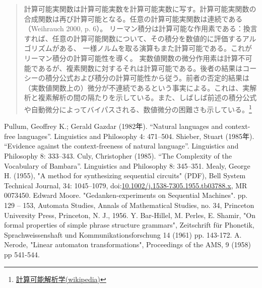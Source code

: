 \begin{quotation}
    計算可能実関数は計算可能実数を計算可能実数に写す。計算可能実関数の合成関数は再び計算可能となる。任意の計算可能実関数は連続である（Weihrauch 2000, p. 6）。
    リーマン積分は計算可能な作用素である：換言すれば、任意の計算可能関数について、その積分を数値的に評価するアルゴリズムがある、
    一様ノルムを取る演算もまた計算可能である。これがリーマン積分の計算可能性を導く。
    実数値関数の微分作用素は計算不可能であるが、複素関数に対するそれは計算可能である。後者の結果はコーシーの積分公式および積分の計算可能性から従う。前者の否定的結果は（実数値関数上の）微分が不連続であるという事実による。これは、実解析と複素解析の間の隔たりを示している。また、しばしば前述の積分公式や自動微分によってバイパスされる、数値微分の困難さも示している。\footnote{\href{https://ja.wikipedia.org/wiki/計算可能解析学}{計算可能解析学(wikipedia)}}
\end{quotation}

\begin{thebibliography}{99}
    Pullum, Geoffrey K.; Gerald Gazdar (1982年). “Natural languages and context-free languages”. Linguistics and Philosophy 4: 471–504.
    Shieber, Stuart (1985年). “Evidence against the context-freeness of natural language”. Linguistics and Philosophy 8: 333–343.
    Culy, Christopher (1985). “The Complexity of the Vocabulary of Bambara”. Linguistics and Philosophy 8: 345–351.
    Mealy, George H. (1955), "A method for synthesizing sequential circuits" (PDF), Bell System Technical Journal, 34: 1045–1079, doi:\url{10.1002/j.1538-7305.1955.tb03788.x}, MR 0073450.
    Edward Moore. "Gedanken-experiments on Sequential Machines". pp. 129 – 153, Automata Studies, Annals of Mathematical Studies, no. 34, Princeton University Press, Princeton, N. J., 1956.
    Y. Bar-Hillel, M. Perles, E. Shamir, "On formal properties of simple phrase structure grammars", Zeitschrift für Phonetik, Sprachweissenshaft und Kommunikationsforschung 14 (1961) pp. 143-172.
    A. Nerode, "Linear automaton transformations", Proceedings of the AMS, 9 (1958) pp 541-544.
\end{thebibliography}

